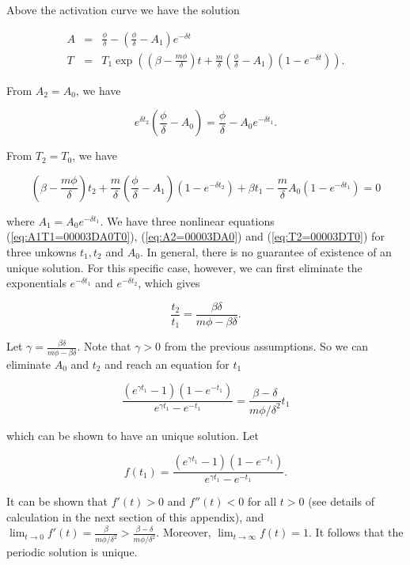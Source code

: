 \documentclass[review,authoryear]{elsarticle}
\begin{document}
Above the activation curve we have the solution 
\begin{linenomath*}
\begin{eqnarray*}
A & = & \frac{\phi}{\delta}-(\frac{\phi}{\delta}-A_{1})e^{-\delta t}\\
T & = & T_{1}\exp((\beta-\frac{m\phi}{\delta})t+\frac{m}{\delta}(\frac{\phi}{\delta}-A_{1})(1-e^{-\delta t})).
\end{eqnarray*}
\end{linenomath*}
From $A_{2}=A_{0}$, we have 
\begin{linenomath*}
\begin{equation}
e^{\delta t_{2}}(\frac{\phi}{\delta}-A_{0})=\frac{\phi}{\delta}-A_{0}e^{-\delta t_{1}}.\label{eq:A2=00003DA0}
\end{equation}
\end{linenomath*}
From $T_{2}=T_{0}$, we have
\begin{linenomath*} 
\begin{equation}
(\beta-\frac{m\phi}{\delta})t_{2}+\frac{m}{\delta}(\frac{\phi}{\delta}-A_{1})(1-e^{-\delta t_{2}})+\beta t_{1}-\frac{m}{\delta}A_{0}(1-e^{-\delta t_{1}})=0\label{eq:T2=00003DT0}
\end{equation}
\end{linenomath*}
where $A_{1}=A_{0}e^{-\delta t_{1}}$. We have three nonlinear equations (\ref{eq:A1T1=00003DA0T0}),
(\ref{eq:A2=00003DA0}) and (\ref{eq:T2=00003DT0}) for three unkowns
$t_{1},t_{2}$ and $A_{0}$. In general, there is no guarantee of existence
of an unique solution. For this specific case, however, we can first
eliminate the exponentials $e^{-\delta t_{1}}$ and $e^{-\delta t_{2}}$,
which gives 
\begin{linenomath*}
\[
\frac{t_{2}}{t_{1}}=\frac{\beta\delta}{m\phi-\beta\delta}.
\]
\end{linenomath*}
Let $\gamma=\frac{\beta\delta}{m\phi-\beta\delta}$. Note that $\gamma>0$
from the previous assumptions. So we can eliminate $A_{0}$ and $t_{2}$
and reach an equation for $t_{1}$
\begin{linenomath*}
\begin{equation}
\frac{(e^{\gamma t_{1}}-1)(1-e^{-t_{1}})}{e^{\gamma t_{1}}-e^{-t_{1}}}=\frac{\beta-\delta}{m\phi/\delta^{2}}t_{1}\label{eq:t1-period}
\end{equation}
\end{linenomath*}
which can be shown to have an unique solution. Let 
\begin{linenomath*}
\begin{equation}
f(t_{1})=\frac{(e^{\gamma t_{1}}-1)(1-e^{-t_{1}})}{e^{\gamma t_{1}}-e^{-t_{1}}}.\label{eq:f(t1)}
\end{equation}
\end{linenomath*}
It can be shown that $f'(t)>0$ and $f''(t)<0$ for all $t>0$ (see
details of calculation in the next section of this appendix), and $\lim_{t\to0}f'(t)=\frac{\beta}{m\phi/\delta^{2}}>\frac{\beta-\delta}{m\phi/\delta^{2}}$.
Moreover, $\lim_{t\to\infty}f(t)=1$. It follows that the periodic
solution is unique.
\end{document}

